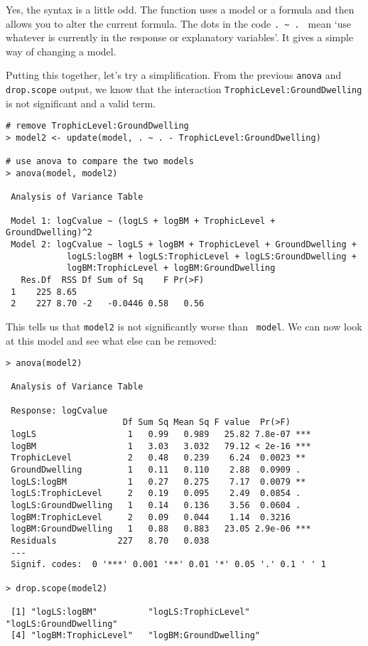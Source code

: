 Yes, the syntax is a little odd. The function uses a model or a formula 
and then allows you to alter the current formula. The dots in the code 
{\tt .~\textasciitilde~. } mean `use whatever is currently in the 
response or explanatory variables'. It gives a simple way of changing a 
model.

Putting this together, let's try a simplification. From the previous 
{\tt anova} and {\tt drop.scope} output, we know that the interaction 
{\tt TrophicLevel:GroundDwelling} is not significant and a valid term.

\begin{lstlisting}
# remove TrophicLevel:GroundDwelling
> model2 <- update(model, . ~ . - TrophicLevel:GroundDwelling)

# use anova to compare the two models
> anova(model, model2)

 Analysis of Variance Table
 
 Model 1: logCvalue ~ (logLS + logBM + TrophicLevel + GroundDwelling)^2
 Model 2: logCvalue ~ logLS + logBM + TrophicLevel + GroundDwelling + 
			logLS:logBM + logLS:TrophicLevel + logLS:GroundDwelling + 
			logBM:TrophicLevel + logBM:GroundDwelling
   Res.Df  RSS Df Sum of Sq    F Pr(>F)
 1    225 8.65                         
 2    227 8.70 -2   -0.0446 0.58   0.56
\end{lstlisting}

This tells us that {\tt model2} is not significantly worse than {\tt 
model}. We can now look at this model and see what else can be removed:

\begin{lstlisting}
> anova(model2)
 
 Analysis of Variance Table
 
 Response: logCvalue
                       Df Sum Sq Mean Sq F value  Pr(>F)    
 logLS                  1   0.99   0.989   25.82 7.8e-07 ***
 logBM                  1   3.03   3.032   79.12 < 2e-16 ***
 TrophicLevel           2   0.48   0.239    6.24  0.0023 ** 
 GroundDwelling         1   0.11   0.110    2.88  0.0909 .  
 logLS:logBM            1   0.27   0.275    7.17  0.0079 ** 
 logLS:TrophicLevel     2   0.19   0.095    2.49  0.0854 .  
 logLS:GroundDwelling   1   0.14   0.136    3.56  0.0604 .  
 logBM:TrophicLevel     2   0.09   0.044    1.14  0.3216    
 logBM:GroundDwelling   1   0.88   0.883   23.05 2.9e-06 ***
 Residuals            227   8.70   0.038                    
 ---
 Signif. codes:  0 '***' 0.001 '**' 0.01 '*' 0.05 '.' 0.1 ' ' 1 
 
> drop.scope(model2)
 
 [1] "logLS:logBM"          "logLS:TrophicLevel"   "logLS:GroundDwelling"
 [4] "logBM:TrophicLevel"   "logBM:GroundDwelling"
\end{lstlisting}


